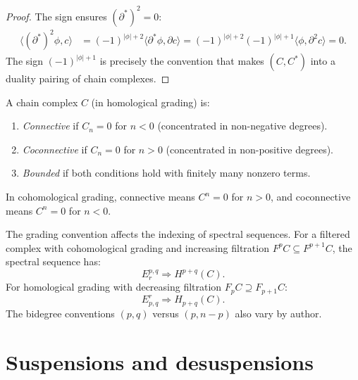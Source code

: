 \begin{proof}
The sign ensures $(\partial^*)^2 = 0$:
\begin{align*}
\langle (\partial^*)^2 \phi, c \rangle
&= (-1)^{|\phi|+2} \langle \partial^* \phi, \partial c \rangle
= (-1)^{|\phi|+2} (-1)^{|\phi|+1} \langle \phi, \partial^2 c \rangle = 0.
\end{align*}
The sign $(-1)^{|\phi|+1}$ is precisely the convention that makes
$(C, C^*)$ into a duality pairing of chain complexes.
\end{proof}

\begin{definition}
\label{def:connective}
A chain complex $C$ (in homological grading) is:
\begin{enumerate}[label=(\roman*)]
\item \emph{Connective} if $C_n = 0$ for $n < 0$ (concentrated in non-negative degrees).
\item \emph{Coconnective} if $C_n = 0$ for $n > 0$ (concentrated in non-positive degrees).
\item \emph{Bounded} if both conditions hold with finitely many nonzero terms.
\end{enumerate}
In cohomological grading, connective means $C^n = 0$ for $n > 0$, and
coconnective means $C^n = 0$ for $n < 0$.
\end{definition}

\begin{remark}
\label{rem:filt-ss-grading}
The grading convention affects the indexing of spectral sequences. For a
filtered complex with cohomological grading and increasing filtration
$F^p C \subseteq F^{p+1} C$, the spectral sequence has:
\[
E_r^{p,q} \Rightarrow H^{p+q}(C).
\]
For homological grading with decreasing filtration $F_p C \supseteq F_{p+1} C$:
\[
E^r_{p,q} \Rightarrow H_{p+q}(C).
\]
The bidegree conventions $(p, q)$ versus $(p, n-p)$ also vary by author.
\end{remark}


\section{Suspensions and desuspensions}
\label{sec:susp-desusp}


